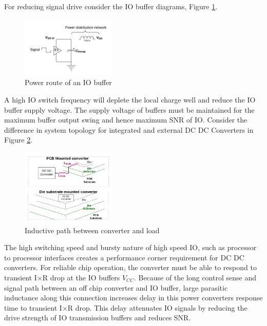 \documentclass[letterpaper,twocolumn,10pt]{article}
\begin{document}
For reducing signal drive consider the IO buffer diagrams, Figure \ref{IOBuf}.\\ %
\begin{figure}[here]
\includegraphics[width=0.4\textwidth]{IOBufferDroop}
\caption{Power route of an IO buffer}
\label{IOBuf}
\end{figure}
A high IO switch frequency will deplete the local charge well and reduce the IO buffer supply voltage. 
The supply voltage of buffers must be maintained for the maximum buffer output swing and hence maximum SNR of IO. Consider the difference in system topology for integrated and external DC DC Converters in Figure \ref{DroopTop}.\\
\begin{figure}[here]
\includegraphics[width=0.4\textwidth]{DroopResponseLatency}
\caption{Inductive path between converter and load}
\label{DroopTop}
\end{figure}
The high switching speed and bursty nature of high speed IO, such as processor to processor interfaces creates a performance corner requirement for DC DC converters. For reliable chip operation, the converter must be able to respond to transient I$\times$R drop at the IO buffers $V_{CC}$. Because of the long control sense and signal path between an off chip converter and IO buffer, large parasitic inductance along this connection increases delay in this power converters response time to transient I$\times$R drop. This delay attenuates IO signals by reducing the drive strength of IO transmission buffers and reduces SNR.\\
\end{document}
